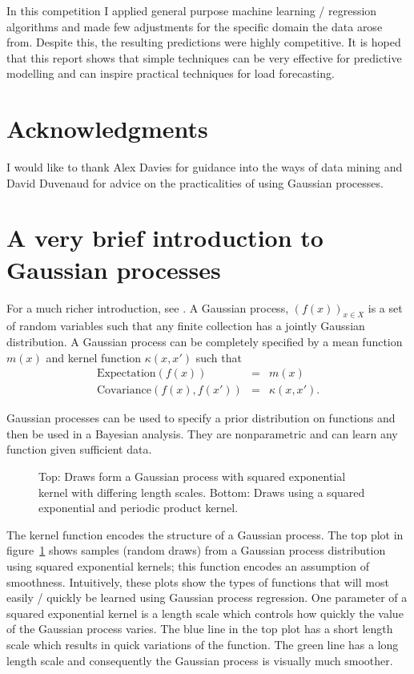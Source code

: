 \documentclass[preprint,authoryear,12pt]{elsarticle}
\begin{document}
In this competition I applied general purpose machine learning / regression algorithms and made few adjustments for the specific domain the data arose from.
Despite this, the resulting predictions were highly competitive.
It is hoped that this report shows that simple techniques can be very effective for predictive modelling and can inspire practical techniques for load forecasting.

\section*{Acknowledgments}

I would like to thank Alex Davies for guidance into the ways of data mining and David Duvenaud for advice on the practicalities of using Gaussian processes.

\appendix

\section{A very brief introduction to Gaussian processes}

For a much richer introduction, see \cite{Rasmussen2006}.
A Gaussian process, $(f(x))_{x \in X}$ is a set of random variables such that any finite collection has a jointly Gaussian distribution.
A Gaussian process can be completely specified by a mean function $m(x)$ and kernel function $\kappa (x, x')$ such that
\begin{eqnarray}
\text{Expectation}(f(x)) & = & m(x) \\
\text{Covariance}(f(x), f(x')) & = & \kappa (x, x').
\end{eqnarray}

Gaussian processes can be used to specify a prior distribution on functions and then be used in a Bayesian analysis.
They are nonparametric and can learn any function given sufficient data.

\begin{figure}[ht]
  \begin{center}
    
  \end{center}
  \caption{Top: Draws form a Gaussian process with squared exponential kernel with differing length scales. Bottom: Draws using a squared exponential and periodic product kernel.}
  \label{fig:gp_samples}
\end{figure}

The kernel function encodes the structure of a Gaussian process.
The top plot in figure~\ref{fig:gp_samples} shows samples (random draws) from a Gaussian process distribution using squared exponential kernels; this function encodes an assumption of smoothness.
Intuitively, these plots show the types of functions that will most easily / quickly be learned using Gaussian process regression.
One parameter of a squared exponential kernel is a length scale which controls how quickly the value of the Gaussian process varies.
The blue line in the top plot has a short length scale which results in quick variations of the function.
The green line has a long length scale and consequently the Gaussian process is visually much smoother.
\end{document}
